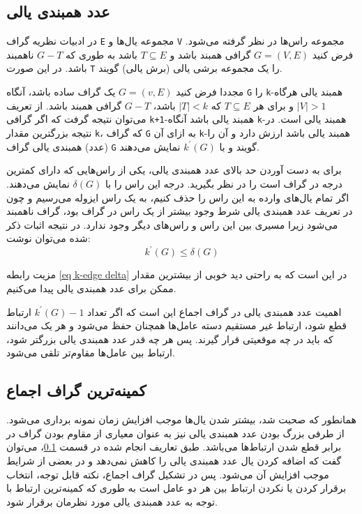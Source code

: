 \subsection{عدد همبندی یالی}\label{se edge connectivity}

 در ادبیات نظریه گراف \verb|E| مجموعه یال‌ها و \verb|V| مجموعه راس‌ها در نظر گرفته می‌شود. فرض کنید
$ G = (V,E)$
  گرافی همبند باشد و 
$T \subseteq E$
باشد به طوری که 
$G - T$
ناهمبند باشد. در این صورت \verb|T| را یک مجموعه برشی یالی (برش یالی) گویند.

مجددا فرض کنید 
$ G = (v,E)$
یک گراف ساده باشد، آنگاه \verb|G| را \verb|k|-همبند یالی هرگاه 
$|V| > 1$
 و برای هر 
$T \subseteq E$
 که 
$|T| < k$
 باشد، 
$G - T$
گرافی همبند باشد. از تعریف می‌توان نتیجه گرفت که اگر گرافی \verb|k+1|-همبند یالی باشد آنگاه \verb|k|-همبند یالی است. در نتیجه بزرگترین مقدار \verb|k|، که گراف \verb|G| به ازای آن \verb|k|-همبند یالی باشد ارزش دارد و آن را (عدد) همبندی یالی گراف \verb|G| گویند و با 
$k^\prime(G)$
نمایش می‌دهند.

برای به دست آوردن حد بالای عدد همبندی یالی، یکی از راس‌هایی که دارای کمترین درجه در گراف است را در نظر بگیرید. درجه این راس را با 
$\delta(G)$
نمایش می‌دهند. اگر تمام یال‌های وارده به این راس را حذف کنیم، به یک راس ایزوله می‌رسیم و چون در تعریف عدد همبندی یالی شرط وجود بیشتر از یک راس در گراف بود، گراف ناهمبند می‌شود زیرا مسیری بین این راس و راس‌های دیگر وجود ندارد. در نتیجه اثبات ذکر شده می‌توان نوشت:
\begin{equation}\label{eq k-edge delta}
k^\prime(G) \leq \delta(G)
\end{equation}

مزیت رابطه \ref{eq k-edge delta} در این است که به راحتی دید خوبی از بیشترین مقدار ممکن برای عدد همبندی یالی پیدا می‌کنیم.

اهمیت عدد همبندی یالی در گراف اجماع این است که اگر تعداد 
$k^\prime(G) - 1$
 ارتباط قطع شود، ارتباط غیر مستقیم دسته عامل‌ها همچنان حفظ می‌شود و هر یک می‌دانند که باید در چه موقعیتی قرار گیرند. پس هر چه قدر عدد همبندی یالی بزرگتر شود، ارتباط بین عامل‌ها مقاوم‌تر تلقی می‌شود.

\subsection{کمینه‌ترین گراف اجماع}\label{sec least formation graph}

همانطور که صحبت شد، بیشتر شدن یال‌ها موجب افزایش زمان نمونه برداری می‌شود. از طرفی بزرگ بودن عدد همبندی یالی نیز به عنوان معیاری از مقاوم بودن گراف در برابر قطع شدن ارتباط‌ها می‌باشد. طبق تعاریف انجام شده در قسمت \ref{se edge connectivity}، می‌توان گفت که اضافه کردن یال عدد همبندی یالی را کاهش نمی‌دهد و در بعضی از شرایط موجب افزایش آن می‌شود. پس در تشکیل گراف اجماع، نکته قابل توجه، انتخاب برقرار کردن یا نکردن ارتباط بین هر دو عامل است به طوری که کمینه‌ترین ارتباط با توجه به عدد همبندی یالی مورد نظرمان برقرار شود.

